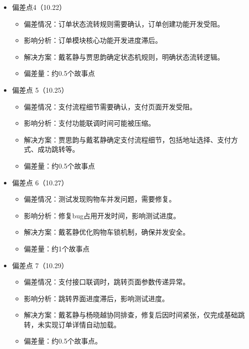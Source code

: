 \begin{levellist}
\begin{enumerate}
\begin{itemize}
                  \item 偏差点4（10.22）
                        \begin{itemize}
                            \item 偏差情况：订单状态流转规则需要确认，订单创建功能开发受阻。
                            \item 影响分析：订单模块核心功能开发进度滞后。
                            \item 解决方案：戴茗静与贾思韵确定状态机规则，明确状态流转逻辑。
                            \item 偏差量：约0.5个故事点
                        \end{itemize}

                  \item 偏差点 5（10.25）
                        \begin{itemize}
                            \item 偏差情况：支付流程细节需要确认，支付页面开发受阻。
                            \item 影响分析：支付功能联调时间可能被压缩。
                            \item 解决方案：贾思韵与戴茗静确定支付流程细节，包括地址选择、支付方式、成功跳转等。
                            \item 偏差量：约0.5个故事点
                        \end{itemize}

                  \item 偏差点 6（10.27）
                        \begin{itemize}
                            \item 偏差情况：测试发现购物车并发问题，需要修复。
                            \item 影响分析：修复bug占用开发时间，影响测试进度。
                            \item 解决方案：戴茗静优化购物车锁机制，确保并发安全。
                            \item 偏差量：约1个故事点
                        \end{itemize}
                  \item 偏差点 7（10.29）
                        \begin{itemize}
                            \item 偏差情况：支付接口联调时，跳转页面参数传递异常。
                            \item 影响分析：跳转界面进度滞后，影响测试进度。
                            \item 解决方案：戴茗静与杨晓越协同排查，修复后因时间紧张，仅完成基础跳转，未实现订单详情自动加载。
                            \item 偏差量：约0.5个故事点。
                        \end{itemize}


\end{itemize}
\end{enumerate}
\end{levellist}
